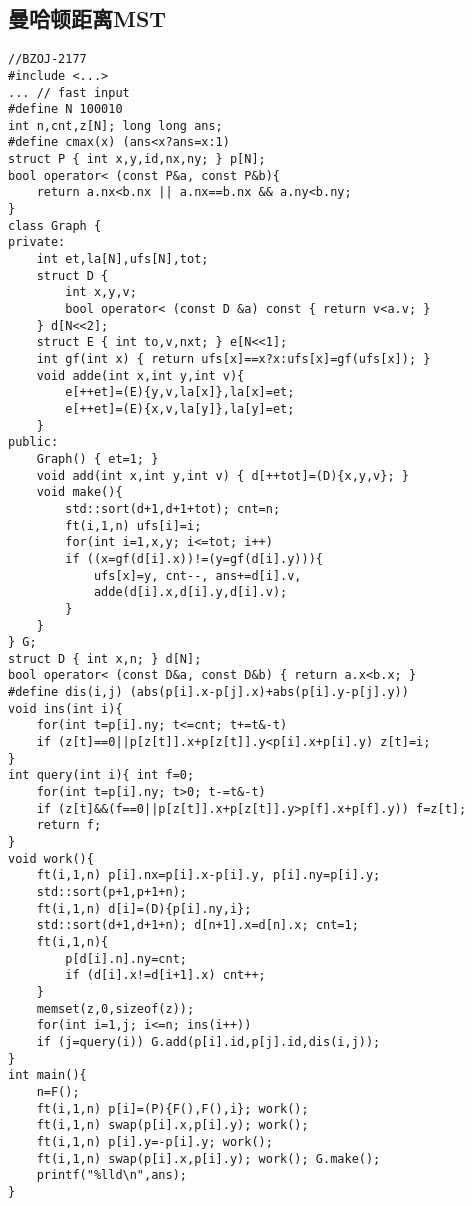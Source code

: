 \documentclass{article}
\begin{document}
\subsection{曼哈顿距离MST}
\begin{lstlisting}
//BZOJ-2177
#include <...>
... // fast input
#define N 100010
int n,cnt,z[N]; long long ans;
#define cmax(x) (ans<x?ans=x:1)
struct P { int x,y,id,nx,ny; } p[N];
bool operator< (const P&a, const P&b){
	return a.nx<b.nx || a.nx==b.nx && a.ny<b.ny;
}
class Graph {
private:
    int et,la[N],ufs[N],tot;
    struct D {
        int x,y,v;
        bool operator< (const D &a) const { return v<a.v; }
    } d[N<<2];
    struct E { int to,v,nxt; } e[N<<1];
    int gf(int x) { return ufs[x]==x?x:ufs[x]=gf(ufs[x]); }
    void adde(int x,int y,int v){
        e[++et]=(E){y,v,la[x]},la[x]=et;
        e[++et]=(E){x,v,la[y]},la[y]=et;
    }
public:
    Graph() { et=1; }
    void add(int x,int y,int v) { d[++tot]=(D){x,y,v}; }
    void make(){
        std::sort(d+1,d+1+tot); cnt=n;
        ft(i,1,n) ufs[i]=i;
        for(int i=1,x,y; i<=tot; i++)
        if ((x=gf(d[i].x))!=(y=gf(d[i].y))){
            ufs[x]=y, cnt--, ans+=d[i].v,
            adde(d[i].x,d[i].y,d[i].v);
        }
    }
} G;
struct D { int x,n; } d[N];
bool operator< (const D&a, const D&b) { return a.x<b.x; }
#define dis(i,j) (abs(p[i].x-p[j].x)+abs(p[i].y-p[j].y))
void ins(int i){
    for(int t=p[i].ny; t<=cnt; t+=t&-t)
    if (z[t]==0||p[z[t]].x+p[z[t]].y<p[i].x+p[i].y) z[t]=i;
}
int query(int i){ int f=0;
    for(int t=p[i].ny; t>0; t-=t&-t)
    if (z[t]&&(f==0||p[z[t]].x+p[z[t]].y>p[f].x+p[f].y)) f=z[t];
    return f;
}
void work(){
    ft(i,1,n) p[i].nx=p[i].x-p[i].y, p[i].ny=p[i].y;
    std::sort(p+1,p+1+n);
    ft(i,1,n) d[i]=(D){p[i].ny,i};
    std::sort(d+1,d+1+n); d[n+1].x=d[n].x; cnt=1;
    ft(i,1,n){
        p[d[i].n].ny=cnt;
        if (d[i].x!=d[i+1].x) cnt++;
    }
    memset(z,0,sizeof(z));
    for(int i=1,j; i<=n; ins(i++))
    if (j=query(i)) G.add(p[i].id,p[j].id,dis(i,j));
}
int main(){
    n=F();
    ft(i,1,n) p[i]=(P){F(),F(),i}; work();
    ft(i,1,n) swap(p[i].x,p[i].y); work();
    ft(i,1,n) p[i].y=-p[i].y; work();
    ft(i,1,n) swap(p[i].x,p[i].y); work(); G.make();
    printf("%lld\n",ans);
}
\end{lstlisting}
\end{document}
